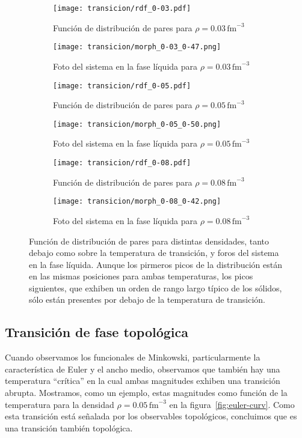 \begin{figure*}[floatfix]
  \centering
  \begin{subfigure}[h!]{0.4\columnwidth}
    \texttt{[image: transicion/rdf\_0-03.pdf]}
    \caption{Función de distribución de pares para $\rho=0.03\,\text{fm}^{-3}$}
  \end{subfigure}
  \begin{subfigure}[h!]{0.3\columnwidth}
    \texttt{[image: transicion/morph\_0-03\_0-47.png]}
    \caption{Foto del sistema en la fase líquida para $\rho=0.03\,\text{fm}^{-3}$}
  \end{subfigure}
  \begin{subfigure}[h!]{0.4\columnwidth}
    \texttt{[image: transicion/rdf\_0-05.pdf]}
    \caption{Función de distribución de pares para $\rho=0.05\,\text{fm}^{-3}$}
  \end{subfigure}
  \begin{subfigure}[h!]{0.3\columnwidth}
    \texttt{[image: transicion/morph\_0-05\_0-50.png]}
    \caption{Foto del sistema en la fase líquida para $\rho=0.05\,\text{fm}^{-3}$}
  \end{subfigure}
  \begin{subfigure}[h!]{0.4\columnwidth}
    \texttt{[image: transicion/rdf\_0-08.pdf]}
    \caption{Función de distribución de pares para $\rho=0.08\,\text{fm}^{-3}$}
  \end{subfigure}
  \begin{subfigure}[h!]{0.3\columnwidth}
    \texttt{[image: transicion/morph\_0-08\_0-42.png]}
    \caption{Foto del sistema en la fase líquida para $\rho=0.08\,\text{fm}^{-3}$}
  \end{subfigure}
  \caption{Función de distribución de pares para distintas densidades, tanto debajo como sobre la temperatura de transición, y foros del sistema en la fase líquida.
Aunque los pirmeros picos de la distribución están en las mismas posiciones para ambas temperaturas, los picos siguientes, que exhiben un orden de rango largo típico de los sólidos, sólo están presentes por debajo de la temperatura de transición.}
  \label{fig:rdf}
\end{figure*}

\subsection{Transición de fase topológica}
Cuando observamos los funcionales de Minkowski, particularmente la característica de Euler y el ancho medio, observamos que también hay una temperatura ``crítica'' en la cual ambas magnitudes exhiben una transición abrupta.
Mostramos, como un ejemplo, estas magnitudes como función de la temperatura para la densidad
$\rho=0.05\,\text{fm}^{-3}$ en la figura~\ref{fig:euler-curv}.
Como esta transición está señalada por los observables topológicos, concluimos que es una transición también topológica.

